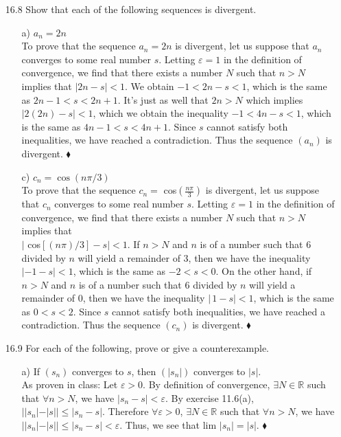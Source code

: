 \documentclass[12pt]{article}
\begin{document}
\begin{enumerate}
\item[16.8] Show that each of the following sequences is divergent.
\begin{enumerate}
\item[a)] $a_n = 2n$ \\
To prove that the sequence $a_n = 2n$ is divergent, let us suppose that $a_n$ converges
to some real number $s$. Letting $\varepsilon = 1$ in the definition of convergence, we find that
there exists a number $N$ such that $n > N$ implies that $|2n - s| < 1$. We obtain 
$-1 < 2n - s < 1$, which is the same as $2n - 1 < s < 2n + 1$. It's just as well that $2n > N$
which implies $|2(2n) - s| < 1$, which we obtain the inequality $-1 < 4n - s < 1$, which
is the same as $4n - 1 < s < 4n + 1$. Since $s$ cannot satisfy both inequalities, we have 
reached a contradiction. Thus the sequence $(a_n)$ is divergent. $\blacklozenge$

\item[c)] $c_n = \cos (n\pi/3)$ \\
To prove that the sequence $c_n =$ cos$\left( \frac{n\pi}{3} \right)$ 
is divergent, let us suppose that $c_n$ converges
to some real number $s$. Letting $\varepsilon = 1$ in the definition of convergence, we find that
there exists a number $N$ such that $n > N$ implies that \\
$|$ cos$[(n\pi )/3] - s| < 1$. If $n > N$ and $n$ is of a number such that $6$ divided by $n$ 
will yield a remainder of $3$, then we have the inequality $| -1 - s | < 1$, which is the same
as $-2 < s < 0$. On the other hand, if $n > N$ and $n$ is of a number such that $6$ divided
by $n$ will yield a remainder of $0$, then we have the inequality $|\, 1 - s | < 1$, which is
the same as $0 < s < 2$. Since $s$ cannot satisfy both inequalities, we have reached
a contradiction. Thus the sequence $(c_n)$ is divergent. $\blacklozenge$
\end{enumerate}

\item[16.9] For each of the following, prove or give a counterexample.
\begin{enumerate}
\item[a)] If $(s_n)$ converges to $s$, then $(|s_n|)$ converges to $|s|$.\\
As proven in class: Let $\varepsilon > 0$. By definition of convergence, 
$\exists N \in \mathbb{R}$ such that $\forall n > N$, we have $|s_n - s| < \varepsilon$.
By exercise 11.6(a), $||s_n| - |s|| \leq |s_n - s|$. Therefore $\forall \varepsilon > 0$,
$\exists N \in \mathbb{R}$ such that $\forall n > N$, we have $||s_n| - |s|| \leq |s_n - s| < 
\varepsilon$. Thus, we see that lim $|s_n| = |s|$. $\blacklozenge$


\end{enumerate}
\end{enumerate}
\end{document}
